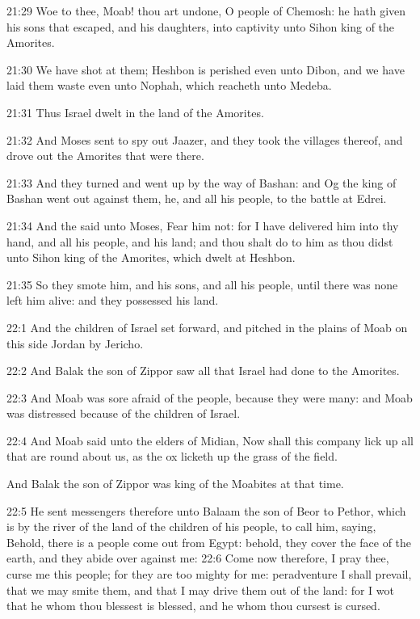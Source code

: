 21:29 Woe to thee, Moab! thou art undone, O people of Chemosh: he hath given his sons that escaped, and his daughters, into captivity unto Sihon king of the Amorites.

21:30 We have shot at them; Heshbon is perished even unto Dibon, and we have laid them waste even unto Nophah, which reacheth unto Medeba.

21:31 Thus Israel dwelt in the land of the Amorites.

21:32 And Moses sent to spy out Jaazer, and they took the villages thereof, and drove out the Amorites that were there.

21:33 And they turned and went up by the way of Bashan: and Og the king of Bashan went out against them, he, and all his people, to the battle at Edrei.

21:34 And the \LORD said unto Moses, Fear him not: for I have delivered him into thy hand, and all his people, and his land; and thou shalt do to him as thou didst unto Sihon king of the Amorites, which dwelt at Heshbon.

21:35 So they smote him, and his sons, and all his people, until there was none left him alive: and they possessed his land.

22:1 And the children of Israel set forward, and pitched in the plains of Moab on this side Jordan by Jericho.

22:2 And Balak the son of Zippor saw all that Israel had done to the Amorites.

22:3 And Moab was sore afraid of the people, because they were many: and Moab was distressed because of the children of Israel.

22:4 And Moab said unto the elders of Midian, Now shall this company lick up all that are round about us, as the ox licketh up the grass of the field.

And Balak the son of Zippor was king of the Moabites at that time.

22:5 He sent messengers therefore unto Balaam the son of Beor to Pethor, which is by the river of the land of the children of his people, to call him, saying, Behold, there is a people come out from Egypt: behold, they cover the face of the earth, and they abide over against me: 22:6 Come now therefore, I pray thee, curse me this people; for they are too mighty for me: peradventure I shall prevail, that we may smite them, and that I may drive them out of the land: for I wot that he whom thou blessest is blessed, and he whom thou cursest is cursed.

